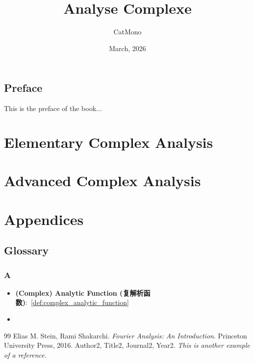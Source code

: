 \documentclass[11pt]{../../TexTemplate/elegantbook} %
\title{Analyse Complexe} %
\author{CatMono} %
\date{March, 2026} %
\begin{document}
\maketitle %

\frontmatter        %
\tableofcontents    %

\chapter{Preface}   %
This is the preface of the book...

\mainmatter         %

\part{Elementary Complex Analysis} %

\part{Advanced Complex Analysis} %

\appendix
\part{Appendices}
\chapter{Glossary}
\section*{A} %
\begin{itemize}
    \item \textbf{(Complex) Analytic Function (复解析函数)}:~\ref{def:complex_analytic_function}
    \item 
\end{itemize}


\begin{thebibliography}{99} 
 Elias M. Stein, Rami Shakarchi. \emph{Fourier Analysis: An Introduction}. Princeton University Press, 2016.
 Author2, Title2, Journal2, Year2. \emph{ This is another example of a reference.}
\end{thebibliography}
\end{document}
